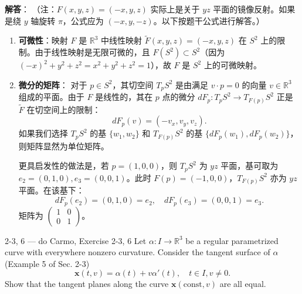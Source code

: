 \begin{solution}
\textbf{解答}：
（注：$F(x,y,z) = (-x,y,z)$ 实际上是关于 $yz$ 平面的镜像反射。如果是绕 $y$ 轴旋转 $\pi$，公式应为 $(-x,y,-z)$。以下按题干公式进行解答。）

\begin{enumerate}
    \item \textbf{可微性}：映射 $F$ 是 $\mathbb{R}^3$ 中线性映射 $\tilde{F}(x, y, z) = (-x, y, z)$ 在 $S^2$ 上的限制。由于线性映射是无限可微的，且 $F(S^2) \subset S^2$（因为 $(-x)^2 + y^2 + z^2 = x^2 + y^2 + z^2 = 1$），故 $F$ 是 $S^2$ 上的可微映射。
    \item \textbf{微分的矩阵}：
    对于 $p \in S^2$，其切空间 $T_pS^2$ 是由满足 $v \cdot p = 0$ 的向量 $v \in \mathbb{R}^3$ 组成的平面。由于 $F$ 是线性的，其在 $p$ 点的微分 $dF_p: T_pS^2 \to T_{F(p)}S^2$ 正是 $\tilde{F}$ 在切空间上的限制：
    \[
    dF_p(v) = (-v_x, v_y, v_z).
    \]
    如果我们选择 $T_pS^2$ 的基 $\{w_1, w_2\}$ 和 $T_{F(p)}S^2$ 的基 $\{dF_p(w_1), dF_p(w_2)\}$，则矩阵显然为单位矩阵。
    
    更具启发性的做法是，若 $p = (1, 0, 0)$，则 $T_pS^2$ 为 $yz$ 平面，基可取为 $e_2=(0,1,0), e_3=(0,0,1)$。此时 $F(p)=(-1,0,0)$，$T_{F(p)}S^2$ 亦为 $yz$ 平面。在该基下：
    \[
    dF_p(e_2) = (0,1,0) = e_2, \quad dF_p(e_3) = (0,0,1) = e_3.
    \]
    矩阵为 $\begin{pmatrix} 1 & 0 \\ 0 & 1 \end{pmatrix}$。
\end{enumerate}
\end{solution}

\begin{exercise}{2-3, 6 — do Carmo, Exercise 2-3, 6}
Let $\alpha: I \to \mathbb{R}^3$ be a regular parametrized curve with everywhere nonzero curvature. Consider the tangent surface of $\alpha$ (Example 5 of Sec. 2-3)
\[
\mathbf{x}(t, v) = \alpha(t) + v \alpha'(t), \quad t \in I, v \neq 0.
\]
Show that the tangent planes along the curve $\mathbf{x}(\mathrm{const},v)$ are all equal.
\end{exercise}

